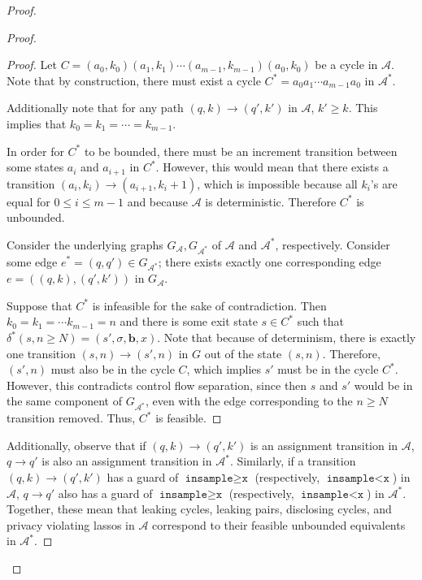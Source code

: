 \documentclass[12pt]{article}
\newcommand{\gguard}{\texttt{insample}\geq \texttt{x}}
\newcommand{\lguard}{\texttt{insample} < \texttt{x}}
\theoremstyle{definition}
\begin{document}
\begin{proof}
\begin{proof}
	\begin{proof}

		Let $C = (a_0, k_0)(a_1, k_1)\cdots (a_{m-1}, k_{m-1})(a_0, k_0)$ be a cycle in $\mathcal{A}$. Note that by construction, there must exist a cycle $C^*=a_0a_1\cdots a_{m-1}a_0$ in $\mathcal{A}^*$.

		Additionally note that for any path $(q, k) \to (q', k')$ in $\mathcal{A}$, $k' \geq k$. This implies that $k_0 = k_1 = \cdots = k_{m-1}$. 

		In order for $C^*$ to be bounded, there must be an increment transition between some states $a_i$ and $a_{i+1}$ in $C^*$. However, this would mean that there exists a transition  $(a_i, k_i)\to (a_{i+1}, k_i + 1)$, which is impossible because all $k_i$'s are equal for $ 0\leq i \leq m-1$ and because $\mathcal{A}$ is deterministic. Therefore $C^*$ is unbounded.

		Consider the underlying graphs $G_\mathcal{A}, G_{\mathcal{A}^*}$ of $\mathcal{A}$ and $\mathcal{A}^*$, respectively. Consider some edge $e^* = (q, q')\in G_{\mathcal{A}^*}$; there exists exactly one corresponding edge $e = ((q, k), (q', k'))$ in $G_{\mathcal{A}}$.

		Suppose that $C^*$ is infeasible for the sake of contradiction. Then $k_0 = k_1 = \cdots k_{m-1} = n$ and there is some exit state $s\in C^*$ such that $\delta^*(s, n\geq N) = (s', \sigma, \mathbf{b}, x)$. Note that because of determinism, there is exactly one transition $(s, n)\to (s', n)$ in $G$ out of the state $(s, n)$. 
		Therefore, $(s', n)$ must also be in the cycle $C$, which implies $s'$ must be in the cycle $C^*$. However, this contradicts control flow separation, since then $s$ and $s'$ would be in the same component of $G_{\mathcal{A}^*}$, even with the edge corresponding to the $n\geq N$ transition removed. Thus, $C^*$ is feasible.
	\end{proof}

	Additionally, observe that if $(q, k)\to (q', k')$ is an assignment transition in $\mathcal{A}$, $q \to q'$ is also an assignment transition in $\mathcal{A}^*$. 
	Similarly, if a transition $(q, k)\to (q', k')$ has a guard of $\gguard$ (respectively, $\lguard$) in $\mathcal{A}$, $q\to q'$ also has a guard of $\gguard$ (respectively, $\lguard$) in $\mathcal{A}^*$. Together, these mean that leaking cycles, leaking pairs, disclosing cycles, and privacy violating lassos in $\mathcal{A}$ correspond to their feasible unbounded equivalents in $\mathcal{A}^*$.

\end{proof}


\end{proof}
\end{document}
